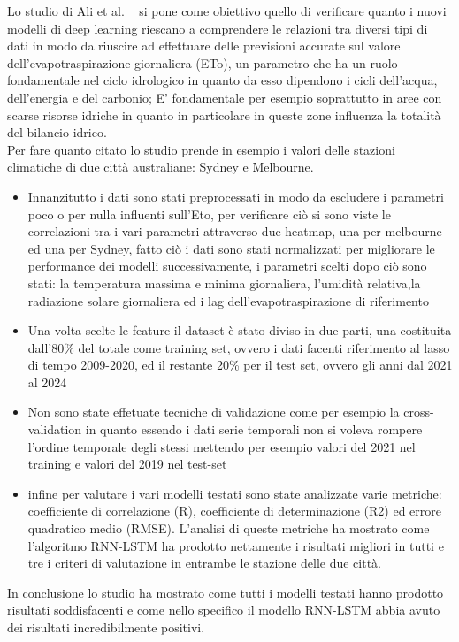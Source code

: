 Lo studio di Ali et al. ~\cite{ali2023evapotranspiration} si pone come obiettivo quello di verificare quanto i nuovi modelli di deep learning riescano a comprendere le relazioni tra diversi tipi di dati in modo da riuscire ad effettuare delle previsioni accurate  sul valore dell'evapotraspirazione giornaliera (ETo), un parametro che ha un ruolo fondamentale nel ciclo idrologico in quanto da esso dipendono i cicli dell'acqua, dell'energia e del carbonio; E' fondamentale per esempio soprattutto in aree con scarse risorse idriche in quanto in particolare in queste zone influenza la totalità del bilancio idrico.\\
Per fare quanto citato lo studio prende in esempio i valori delle stazioni climatiche di due città australiane: Sydney e Melbourne.
\begin{itemize}
	\item Innanzitutto i dati sono stati preprocessati in modo da escludere i parametri poco o per nulla influenti sull'Eto, per verificare ciò si sono viste le correlazioni tra i vari parametri attraverso due heatmap, una per melbourne ed una per Sydney, fatto ciò i dati sono stati normalizzati per migliorare le performance dei modelli successivamente, i parametri scelti dopo ciò sono stati: la temperatura massima e minima giornaliera, l'umidità relativa,la radiazione solare giornaliera ed i lag dell'evapotraspirazione di riferimento
	\item Una volta scelte le feature il dataset è stato diviso in due parti, una costituita dall'80\% del totale come training set, ovvero i dati facenti riferimento al lasso di tempo 2009-2020, ed il restante 20\% per il test set, ovvero gli anni dal 2021 al 2024
	\item Non sono state effetuate tecniche di validazione come per esempio la cross-validation in quanto essendo i dati serie temporali non si voleva rompere l'ordine temporale degli stessi mettendo per esempio valori del 2021 nel training e valori del 2019 nel test-set
	\item infine per valutare i vari modelli testati sono state analizzate varie metriche: coefficiente di correlazione (R), coefficiente di determinazione (R2) ed errore quadratico medio (RMSE). L'analisi di queste metriche ha mostrato come l'algoritmo RNN-LSTM ha prodotto nettamente i risultati migliori in tutti e tre i criteri di valutazione in entrambe le stazione delle due città.
\end{itemize}
In conclusione lo studio ha mostrato come tutti i modelli testati hanno prodotto risultati soddisfacenti e come nello specifico il modello RNN-LSTM abbia avuto dei risultati incredibilmente positivi.

